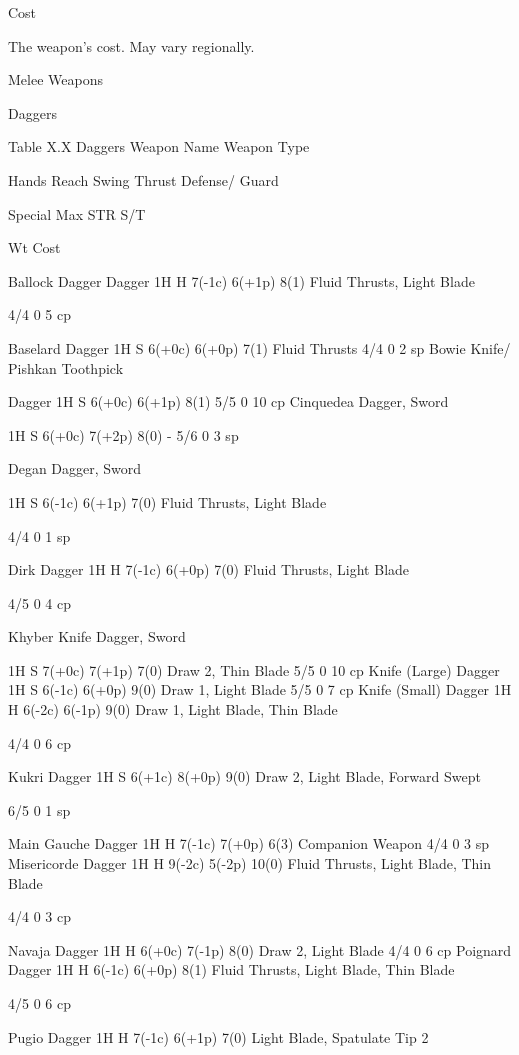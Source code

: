 \documentclass[oneside,11pt,english]{book}
\begin{document}
 

Cost 


The weapon’s cost. May vary regionally. 

 

Melee Weapons 

 

Daggers 

 
Table X.X Daggers 
Weapon Name Weapon 
Type 

Hands Reach Swing Thrust Defense/ 
Guard 

Special Max 
STR 
S/T 

Wt Cost 

Ballock Dagger Dagger 1H H 7(-1c) 6(+1p) 8(1) Fluid Thrusts, Light 
Blade 

4/4 0 5 cp 

Baselard Dagger 1H S 6(+0c) 6(+0p) 7(1) Fluid Thrusts 4/4 0 2 sp 
Bowie Knife/ Pishkan 
Toothpick 

Dagger 1H S 6(+0c) 6(+1p) 8(1) 5/5 0 10 
cp 
Cinquedea Dagger, 
Sword 

1H S 6(+0c) 7(+2p) 8(0) - 5/6 0 3 sp 

Degan Dagger, 
Sword 

1H S 6(-1c) 6(+1p) 7(0) Fluid Thrusts, Light 
Blade 

4/4 0 1 sp 

Dirk Dagger 1H H 7(-1c) 6(+0p) 7(0) Fluid Thrusts, Light 
Blade 

4/5 0 4 cp 

Khyber Knife Dagger, 
Sword 

1H S 7(+0c) 7(+1p) 7(0) Draw 2, Thin Blade 5/5 0 10 
cp 
Knife (Large) Dagger 1H S 6(-1c) 6(+0p) 9(0) Draw 1, Light Blade 5/5 0 7 cp 
Knife (Small) Dagger 1H H 6(-2c) 6(-1p) 9(0) Draw 1, Light Blade, 
Thin Blade 

4/4 0 6 cp 

Kukri Dagger 1H S 6(+1c) 8(+0p) 9(0) Draw 2, Light Blade, 
Forward Swept 

6/5 0 1 sp 

Main Gauche Dagger 1H H 7(-1c) 7(+0p) 6(3) Companion Weapon 4/4 0 3 sp 
Misericorde Dagger 1H H 9(-2c) 5(-2p) 10(0) Fluid Thrusts, Light 
Blade, Thin Blade 

4/4 0 3 cp 

Navaja Dagger 1H H 6(+0c) 7(-1p) 8(0) Draw 2, Light Blade 4/4 0 6 cp 
Poignard Dagger 1H H 6(-1c) 6(+0p) 8(1) Fluid Thrusts, Light 
Blade, Thin Blade 

4/5 0 6 cp 

Pugio Dagger 1H H 7(-1c) 6(+1p) 7(0) Light Blade, Spatulate 
Tip 2 
\end{document}
